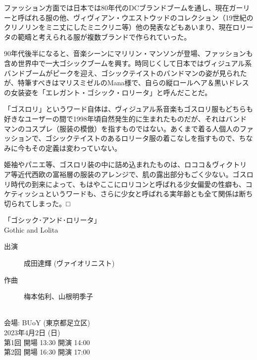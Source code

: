 \documentclass[a6paper, 9pt, openright, titlepage, twoside]{ltjsarticle}
\begin{document}
ファッション方面では日本では80年代のDCブランドブームを通し、現在ガーリーと呼ばれる服の他、ヴィヴィアン・ウエストウッドのコレクション（19世紀のクリノリンをミニ丈にしたミニクリニ等）他の発表などもあいまり、現在ロリータの範疇と考えられる服が複数ブランドで作られていった。

90年代後半になると、音楽シーンにマリリン・マンソンが登場、ファッションも含め世界中で一大ゴシックブームを興す。時同じくして日本ではヴィジュアル系バンドブームがピークを迎え、ゴシックテイストのバンドマンの姿が見られたが、特筆すべきはマリスミゼルのMana様で、自らの縦ロールヘア＆黒いドレスの女装姿を「エレガント・ゴシック・ロリータ」と呼んだことだ。

「ゴスロリ」というワード自体は、ヴィジュアル系音楽もゴスロリ服もどちらも好きなユーザーの間で1998年頃自然発生的に生まれたものだが、それはバンドマンのコスプレ（服装の模倣）を指すものではない。あくまで着る人個人のファッションで、ゴシックテイストのあるロリータ服の着こなしを指すもので、ちなみに今もその定義は変わっていない。

姫袖やパニエ等、ゴスロリ装の中に詰め込まれたものは、ロココ＆ヴィクトリア等近代西欧の富裕層の服装のアレンジで、肌の露出部分もごく少ない。ゴスロリ時代の到来によって、もはやここにロリコンと呼ばれる少女偏愛の性癖も、コケティッシュというワードも、さらに少女と呼ばれる実年齢とも全て関係は断ち切られてしまった。□


\newpage
\thispagestyle{empty}



\begin{center}
{\Large \ttfamily「ゴシック･アンド･ロリータ」} \\
{\ttfamily Gothic and Lolita} \\
\end{center}

\begin{description}
\item[出演] 成田達輝 (ヴァイオリニスト)
\item[作曲] 梅本佑利、山根明季子 
\end{description}

\noindent \\会場: BUoY (東京都足立区)  \\

\noindent 2023年4月2日 (日)  \\
第1回 開場 13:30 開演 14:00 \\
第2回 開場 16:30 開演 17:00  \\
\end{document}
